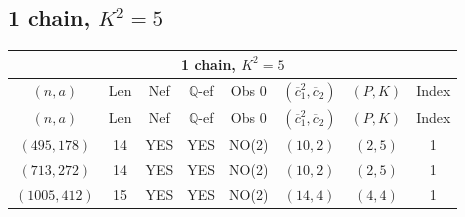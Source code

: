 \subsection{1 chain, $K^2 = 5$}
\begin{longtable}{|c|c|c|c|c|c|c|c|}
\hline
\multicolumn{8}{|c|}{1 chain, $K^2 = 5$}\\
\hline
$(n,a)$ & Len & Nef & $\mathbb Q$-ef & Obs 0 & $(\overline c_1^2,\overline c_2)$ & $(P,K)$ & Index\\
\hline
\endfirsthead

\hline
$(n,a)$ & Len & Nef & $\mathbb Q$-ef & Obs 0 & $(\overline c_1^2,\overline c_2)$ & $(P,K)$ & Index\\
\hline
\endhead
\hline
\endfoot

$(495,178)$ & 14 & YES & YES & NO(2) & $(10,2)$ & $(2,5)$ & 1\\
$(713,272)$ & 14 & YES & YES & NO(2) & $(10,2)$ & $(2,5)$ & 1\\
$(1005,412)$ & 15 & YES & YES & NO(2) & $(14,4)$ & $(4,4)$ & 1
\end{longtable}
